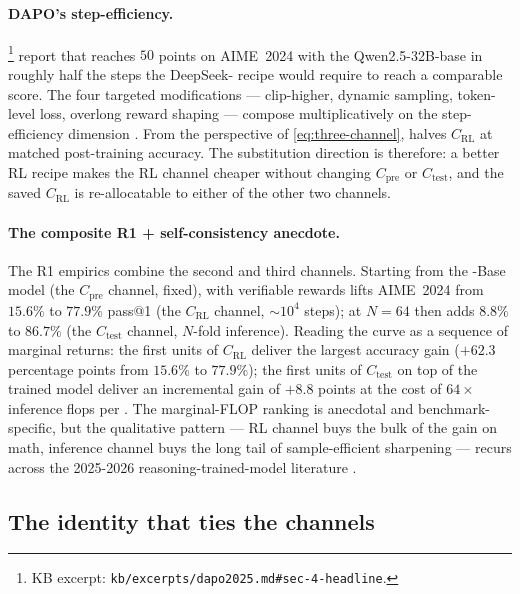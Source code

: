 \paragraph{DAPO's step-efficiency.}
\citet[\S 4]{dapo2025}%
\footnote{KB excerpt: \nolinkurl{kb/excerpts/dapo2025.md#sec-4-headline}.}
report that  reaches $50$ points on AIME~2024 with the
Qwen2.5-32B-base in roughly half the  steps the DeepSeek-
recipe would require to reach a comparable score. The four targeted
modifications --- clip-higher, dynamic sampling, token-level loss,
overlong reward shaping --- compose multiplicatively on the
step-efficiency dimension \citep[\S 3]{dapo2025}. From the perspective
of \cref{eq:three-channel},  halves $C_\text{RL}$ at matched
post-training accuracy. The substitution direction is therefore: a
better RL recipe makes the RL channel cheaper without changing
$C_\text{pre}$ or $C_\text{test}$, and the saved $C_\text{RL}$ is
re-allocatable to either of the other two channels.

\paragraph{The composite R1 + self-consistency anecdote.} The R1
empirics combine the second and third channels. Starting from the
-Base model (the $C_\text{pre}$ channel, fixed),  with
verifiable rewards lifts AIME~2024 from $15.6\%$ to $77.9\%$ pass@1
(the $C_\text{RL}$ channel, $\sim\!10^{4}$  steps); 
at $N = 64$ then adds $8.8\%$ to $86.7\%$ (the $C_\text{test}$ channel,
$N$-fold inference). Reading the curve as a sequence of marginal
returns: the first units of $C_\text{RL}$ deliver the largest accuracy
gain ($+62.3$ percentage points from $15.6\%$ to $77.9\%$); the first
units of $C_\text{test}$ on top of the trained model deliver an
incremental gain of $+8.8$ points at the cost of $64\times$ inference
flops per . The marginal-FLOP ranking is anecdotal and
benchmark-specific, but the qualitative pattern --- RL channel buys
the bulk of the gain on math, inference channel buys the long tail of
sample-efficient sharpening --- recurs across the 2025-2026
reasoning-trained-model literature \citep[\S 2.3]{deepseek-r1}.

\subsection{The identity that ties the channels}
\label{sec:svr-identity}

